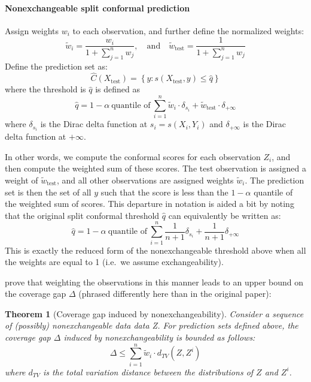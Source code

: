 \documentclass[a4paper, 12pt]{article}
\newtheorem{theorem}{Theorem}
\begin{document}
\paragraph{Nonexchangeable split conformal prediction} Assign weights $w_i$ to each observation, and further define the normalized weights:
\[ \tilde{w}_i = \frac{w_i}{1 + \sum_{j=1}^n w_j}, \quad \text{and} \quad \tilde{w}_{\text{test}} = \frac{1}{1 + \sum_{j=1}^n w_j} \]
Define the prediction set as:
\[ \hat{C}(X_{\text{test}}) = \left\{ y: s(X_{\text{test}}, y) \leq \hat{q} \right\} \]
where the threshold is $\hat{q}$ is defined as
\[ \hat{q} = 1-\alpha ~\text{quantile of}~\sum_{i=1}^n \tilde{w}_i \cdot \delta_{s_i} + \tilde{w}_{\text{test}} \cdot \delta_{+\infty} \]
where $\delta_{s_i}$ is the Dirac delta function at $s_i=s(X_i, Y_i)$ and $\delta_{+\infty}$ is the Dirac delta function at $+\infty$.

In other words, we compute the conformal scores for each observation $Z_i$, and then compute the weighted sum of these scores. The test observation is assigned a weight of $\tilde{w}_{\text{test}}$, and all other observations are assigned weights $\tilde{w}_i$. The prediction set is then the set of all $y$ such that the score is less than the $1-\alpha$ quantile of the weighted sum of scores. This departure in notation is aided a bit by noting that the original split conformal threshold $\hat{q}$ can equivalently be written as:
\[ \hat{q} = 1-\alpha ~\text{quantile of}~\sum_{i=1}^n \frac{1}{n+1}\delta_{s_i} + \frac{1}{n+1}\delta_{+\infty}\]
This is exactly the reduced form of the nonexchangeable threshold above when all the weights are equal to 1 (i.e.\ we assume exchangeability).

\citeauthor{barberConformalPredictionExchangeability2023} prove that weighting the observations in this manner leads to an upper bound on the coverage gap $\Delta$ (phrased differently here than in the original paper):
\begin{theorem}[Coverage gap induced by nonexchangeability]
    Consider a sequence of (possibly) nonexchangeable data data Z. For prediction sets defined above, the coverage gap $\Delta$ induced by nonexchangeability is bounded as follows:
    \[\Delta \leq \sum_{i=1}^n \tilde{w}_i \cdot d_{TV}(Z, Z^i)\]
    where $d_{TV}$ is the total variation distance between the distributions of $Z$ and $Z^i$.
\end{theorem}
\end{document}
